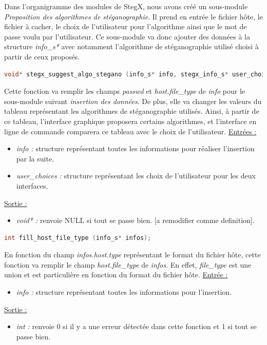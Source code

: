 \documentclass[11pt]{article}
\begin{document}
Dans l'organigramme des modules de StegX, nous avons créé un sous-module 
\textit{Proposition des algorithmes de stéganographie}. Il prend en entrée 
le fichier hôte, le fichier à cacher, le choix de l'utilisateur pour 
l'algorithme ainsi que le mot de passe voulu par l'utilisateur. 
Ce sous-module va donc ajouter des données à la structure \textit{info\_s*} 
avec notamment l'algorithme de stéganographie utilisé choisi à partir de ceux 
proposés. 

\begin{lstlisting}[language=c]
void* stegx_suggest_algo_stegano (info_s* info, stegx_info_s* user_choices);
\end{lstlisting}

Cette fonction va remplir les champs \textit{passwd} et \textit{host.file\_type} 
de \textit{info} pour le sous-module suivant \textit{insertion des données}. 
De plus, elle va changer les valeurs du tableau représentant les algorithmes 
de stéganographie utilisés. Ainsi, à partir de ce tableau, l'interface graphique 
proposera certains algorithmes, et l'interface en ligne de commande comparera 
ce tableau avec le choix de l'utilisateur. 
\newline
\underline{Entrées :} 
\begin{itemize}
\item \textit{info :} structure représentant toutes les informations pour 
réaliser l'insertion par la suite. 
\item \textit{user\_choices :} structure représentant les choix de 
l'utilisateur pour les deux interfaces. 
\end{itemize}
\underline{Sortie :} 
\begin{itemize}
\item \textit{void* :} renvoie NULL si tout se passe bien. [a remodifier 
comme definition]. 
\newline 
\end{itemize}

\begin{lstlisting}[language=c]
int fill_host_file_type (info_s* infos);
\end{lstlisting}

En fonction du champ \textit{infos.host.type} représentant le format du 
fichier hôte, cette fonction va remplir le champ \textit{host.file\_type} 
de \textit{infos}. En effet, \textit{file\_type} est une union et est 
particulière en fonction du format du fichier hôte. 
\newline
\underline{Entrée :} 
\begin{itemize}
\item \textit{info :} structure représentant toutes les informations pour 
l'insertion. 
\end{itemize}
\underline{Sortie :} 
\begin{itemize}
\item \textit{int :} renvoie 0 si il y a une erreur détectée dans cette 
fonction et 1 si tout se passe bien. 
\newline 
\end{itemize}
\end{document}
